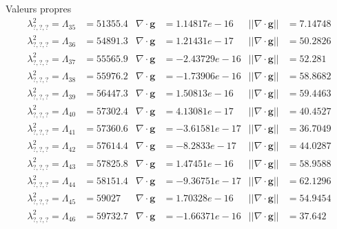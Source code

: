 \documentclass{beamer}
\renewcommand{\div}{{\nabla\cdot}}
\begin{document}
\begin{frame}{Valeurs propres}
\begin{align*}
\lambda^2_{?,?,?}=\Lambda_{35} &= 51355.4	&\div\bm{g} &= 1.14817e-16	&||\div\bm{g}|| &= 7.14748\\
\lambda^2_{?,?,?}=\Lambda_{36} &= 54891.3	&\div\bm{g} &= 1.21431e-17	&||\div\bm{g}|| &= 50.2826\\
\lambda^2_{?,?,?}=\Lambda_{37} &= 55565.9	&\div\bm{g} &= -2.43729e-16	&||\div\bm{g}|| &= 52.281\\
\lambda^2_{?,?,?}=\Lambda_{38} &= 55976.2	&\div\bm{g} &= -1.73906e-16	&||\div\bm{g}|| &= 58.8682\\
\lambda^2_{?,?,?}=\Lambda_{39} &= 56447.3	&\div\bm{g} &= 1.50813e-16	&||\div\bm{g}|| &= 59.4463\\
\lambda^2_{?,?,?}=\Lambda_{40} &= 57302.4	&\div\bm{g} &= 4.13081e-17	&||\div\bm{g}|| &= 40.4527\\
\lambda^2_{?,?,?}=\Lambda_{41} &= 57360.6	&\div\bm{g} &= -3.61581e-17	&||\div\bm{g}|| &= 36.7049\\
\lambda^2_{?,?,?}=\Lambda_{42} &= 57614.4	&\div\bm{g} &= -8.2833e-17	&||\div\bm{g}|| &= 44.0287\\
\lambda^2_{?,?,?}=\Lambda_{43} &= 57825.8	&\div\bm{g} &= 1.47451e-16	&||\div\bm{g}|| &= 58.9588\\
\lambda^2_{?,?,?}=\Lambda_{44} &= 58151.4	&\div\bm{g} &= -9.36751e-17	&||\div\bm{g}|| &= 62.1296\\
\lambda^2_{?,?,?}=\Lambda_{45} &= 59027	&\div\bm{g} &= 1.70328e-16	&||\div\bm{g}|| &= 54.9454\\
\lambda^2_{?,?,?}=\Lambda_{46} &= 59732.7	&\div\bm{g} &= -1.66371e-16	&||\div\bm{g}|| &= 37.642
\end{align*}
\end{frame}
\end{document}
